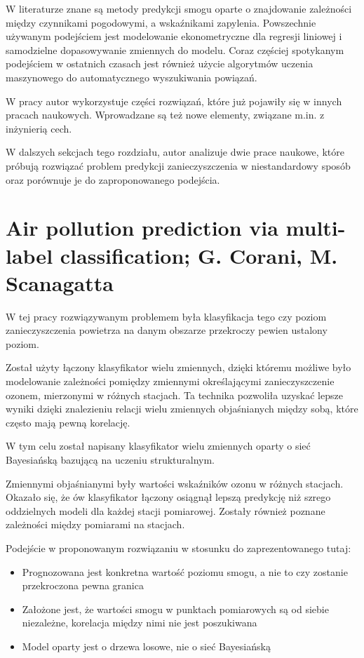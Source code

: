 \documentclass[a4paper,12pt,twoside,openany]{report}
\begin{document}
W literaturze znane są metody predykcji smogu oparte o znajdowanie zależności między czynnikami pogodowymi, a wskaźnikami zapylenia. Powszechnie używanym podejściem jest modelowanie ekonometryczne dla regresji liniowej i samodzielne dopasowywanie zmiennych do modelu. Coraz częściej spotykanym podejściem w ostatnich czasach jest również użycie algorytmów uczenia maszynowego do automatycznego wyszukiwania powiązań. 

W pracy autor wykorzystuje części rozwiązań, które już pojawiły się w innych pracach naukowych. Wprowadzane są też nowe elementy, związane m.in. z inżynierią cech.

W dalszych sekcjach tego rozdziału, autor analizuje dwie prace naukowe, które próbują rozwiązać problem predykcji zanieczyszczenia w niestandardowy sposób oraz porównuje je do zaproponowanego podejścia.

\section{Air pollution prediction via multi-label classification; G. Corani, M. Scanagatta}

W tej pracy\cite{z4} rozwiązywanym problemem była klasyfikacja tego czy poziom zanieczyszczenia powietrza na danym obszarze przekroczy pewien ustalony poziom.

Został użyty łączony klasyfikator wielu zmiennych, dzięki któremu możliwe było modelowanie zależności pomiędzy zmiennymi określającymi zanieczyszczenie ozonem, mierzonymi w różnych stacjach. Ta technika pozwoliła uzyskać lepsze wyniki dzięki znalezieniu relacji wielu zmiennych objaśnianych między sobą, które często mają pewną korelację.

W tym celu został napisany klasyfikator wielu zmiennych oparty o sieć Bayesiańską bazującą na uczeniu strukturalnym. 

Zmiennymi objaśnianymi były wartości wskaźników ozonu w różnych stacjach. Okazało się, że ów klasyfikator łączony osiągnął lepszą predykcję niż szrego oddzielnych modeli dla każdej stacji pomiarowej. Zostały również poznane zależności między pomiarami na stacjach.

Podejście w proponowanym rozwiązaniu w stosunku do zaprezentowanego tutaj:
\begin{itemize}
	\item Prognozowana jest konkretna wartość poziomu smogu, a nie to czy zostanie przekroczona pewna granica
	
	\item Założone jest, że wartości smogu w punktach pomiarowych są od siebie niezależne, korelacja między nimi nie jest poszukiwana
	
	\item Model oparty jest o drzewa losowe, nie o sieć Bayesiańską
\end{itemize}
\end{document}
